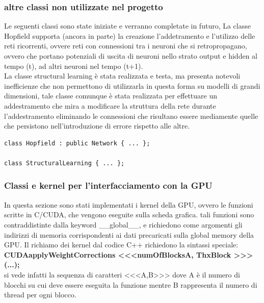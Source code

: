\documentclass[10pt,a4paper]{article}
\begin{document}
\subsubsection{altre classi non utilizzate nel progetto}
Le seguenti classi sono state iniziate e verranno completate in futuro, La classe Hopfield supporta (ancora in parte) la creazione l'addetramento e l'utilizzo delle reti ricorrenti, ovvere reti con connessioni tra i neuroni che si retropropagano, ovvero che portano potenziali di uscita di neuroni nello strato output e hidden al tempo (t), ad altri neuroni nel tempo (t+1).\\
La classe structural learning è stata realizzata e testa, ma presenta notevoli inefficienze che non permettono di utilizzarla in questa forma su modelli di grandi dimensioni, tale classe comunque è stata realizzata per effettuare un addestramento che mira a modificare la struttura della rete durante l'addestramento eliminando le connessioni che risultano essere mediamente quelle che persistono nell'introduzione di errore rispetto alle altre.
\begin{lstlisting}[style=mycuda, caption=altre classi, captionpos=b]
class Hopfield : public Network { ... };

class StructuralLearning { ... };
\end{lstlisting}

\subsubsection{Classi e kernel per l'interfacciamento con la GPU}
In questa sezione sono stati implementati i kernel della GPU, ovvero le funzioni scritte in C/CUDA, che vengono eseguite sulla scheda grafica. tali funzioni sono contraddistinte dalla keyword \_\_global\_\_,  e richiedono come argomenti gli indirizzi di memoria corrispondenti ai dati precaricati sulla global memory della GPU.
Il richiamo dei kernel dal codice C++ richiedono la sintassi speciale: \\
\textbf{CUDAapplyWeightCorrections <<<numOfBlocksA, ThxBlock >>> (...);} \\
si vede infatti la sequenza di caratteri <<<A,B>>> dove A è il numero di blocchi su cui deve essere eseguita la funzione mentre B rappresenta il numero di thread per ogni blocco.
\end{document}
